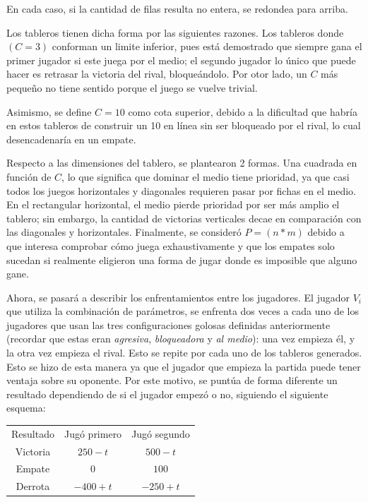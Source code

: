 \documentclass[12pt,a4paper]{article}
\begin{document}
    En cada caso, si la cantidad de filas resulta no entera, se redondea para arriba.
    
    Los tableros tienen dicha forma por las siguientes razones. Los tableros donde $(C=3)$ conforman un limite inferior, pues está demostrado que siempre gana el primer jugador si este juega por el medio; el segundo jugador lo único que puede hacer es retrasar la victoria del rival, bloqueándolo. Por otor lado, un $C$ más pequeño no tiene sentido porque el juego se vuelve trivial.
    
    Asimismo, se define $C=10$ como cota superior, debido a la dificultad que habría en estos tableros de construir un 10 en línea sin ser bloqueado por el rival, lo cual desencadenaría en un empate.
    
    Respecto a las dimensiones del tablero, se plantearon 2 formas. Una cuadrada en función de $C$, lo que significa que dominar el medio tiene prioridad, ya que casi todos los juegos horizontales y diagonales requieren pasar por fichas en el medio. En el rectangular horizontal, el medio pierde prioridad por ser más amplio el tablero; sin embargo, la cantidad de victorias verticales decae en comparación con las diagonales y horizontales. Finalmente, se consideró $P= (n * m)$ debido a que interesa comprobar cómo juega exhaustivamente y que los empates solo sucedan si realmente eligieron una forma de jugar donde es imposible que alguno gane.
    
    Ahora, se pasará a describir los enfrentamientos entre los jugadores. El jugador $V_{i}$ que utiliza la combinación de parámetros, se enfrenta dos veces a cada uno de los jugadores que usan las tres configuraciones golosas definidas anteriormente (recordar que estas eran \textit{agresiva}, \textit{bloqueadora} y \textit{al medio}): una vez empieza él, y la otra vez empieza el rival. Esto se repite por cada uno de los tableros generados. Esto se hizo de esta manera ya que el jugador que empieza la partida puede tener ventaja sobre su oponente. Por este motivo, se puntúa de forma diferente un resultado dependiendo de si el jugador empezó o no, siguiendo el siguiente esquema:
    
    \begin{center}
		\begin{tabular}{ | c || c | c | }
		\hline
		Resultado &  Jugó primero &  Jugó segundo \\ \hhline{|=#=|=|}
		    Victoria &  $250 - t$ &  $500 - t$ \\ \hline
		    Empate &  $0$ &  $100$ \\ \hline
		    Derrota &  $-400 + t$ &  $-250 + t$ \\ \hline
		\end{tabular}
    \end{center}
    
\end{document}
